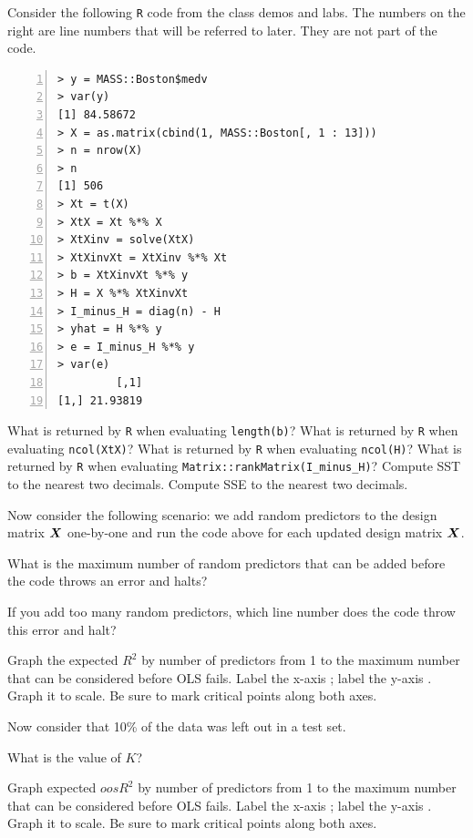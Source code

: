 \documentclass[12pt]{article}
\begin{document}
\problem Consider the following \texttt{R} code from the class demos and labs. The numbers on the right are line numbers that will be referred to later. They are not part of the code.
\begin{Verbatim}[frame=single,numbers=left]
> y = MASS::Boston$medv
> var(y)
[1] 84.58672
> X = as.matrix(cbind(1, MASS::Boston[, 1 : 13]))
> n = nrow(X)
> n
[1] 506
> Xt = t(X)
> XtX = Xt %*% X
> XtXinv = solve(XtX)
> XtXinvXt = XtXinv %*% Xt
> b = XtXinvXt %*% y
> H = X %*% XtXinvXt
> I_minus_H = diag(n) - H
> yhat = H %*% y
> e = I_minus_H %*% y
> var(e)
         [,1]
[1,] 21.93819
\end{Verbatim}


\benum
{} What is returned by \texttt{R} when evaluating \texttt{length(b)}?
 What is returned by \texttt{R} when evaluating \texttt{ncol(XtX)}?
 What is returned by \texttt{R} when evaluating \texttt{ncol(H)}?
 What is returned by \texttt{R} when evaluating \texttt{Matrix::rankMatrix(I\_minus\_H)}?
 Compute SST to the nearest two decimals.
 Compute SSE to the nearest two decimals.

Now consider the following scenario: we add random predictors to the design matrix $\boldsymbol{X}$ one-by-one and run the code above for each updated design matrix $\boldsymbol{X}$.

 What is the maximum number of random predictors that can be added before the code throws an error and halts? 

 If you add too many random predictors, which line number does the code throw this error and halt? 

 Graph the expected $R^2$ by number of predictors from 1 to the maximum number that can be considered before OLS fails. Label the x-axis ; label the y-axis . Graph it to scale. Be sure to mark critical points along both axes. 

Now consider that 10\% of the data was left out in a test set.

 What is the value of $K$?

 Graph expected $oosR^2$ by number of predictors from 1 to the maximum number that can be considered before OLS fails. Label the x-axis ; label the y-axis . Graph it to scale. Be sure to mark critical points along both axes. 
\end{document}
